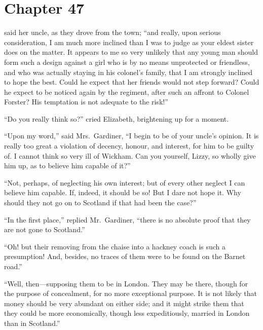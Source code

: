 \chapter{Chapter 47}


 said her uncle,
as they drove from the town; ``and really, upon serious
consideration, I am much more inclined than I was to judge as
your eldest sister does on the matter.  It appears to me so very
unlikely that any young man should form such a design against
a girl who is by no means unprotected or friendless, and who
was actually staying in his colonel's family, that I am strongly
inclined to hope the best.  Could he expect that her friends
would not step forward?  Could he expect to be noticed again
by the regiment, after such an affront to Colonel Forster?  His
temptation is not adequate to the risk!''

``Do you really think so?'' cried Elizabeth, brightening up for a
moment.

``Upon my word,'' said Mrs.\ Gardiner, ``I begin to be of your
uncle's opinion.  It is really too great a violation of decency,
honour, and interest, for him to be guilty of.  I cannot think
so very ill of Wickham.  Can you yourself, Lizzy, so wholly give
him up, as to believe him capable of it?''

``Not, perhaps, of neglecting his own interest; but of every other
neglect I can believe him capable.  If, indeed, it should be so!
But I dare not hope it.  Why should they not go on to Scotland
if that had been the case?''

``In the first place,'' replied Mr.\ Gardiner, ``there is no absolute
proof that they are not gone to Scotland.''

``Oh! but their removing from the chaise into a hackney coach is
such a presumption!  And, besides, no traces of them were to be
found on the Barnet road.''

``Well, then---supposing them to be in London.  They may be there,
though for the purpose of concealment, for no more exceptional
purpose.  It is not likely that money should be very abundant on
either side; and it might strike them that they could be more
economically, though less expeditiously, married in London
than in Scotland.''

